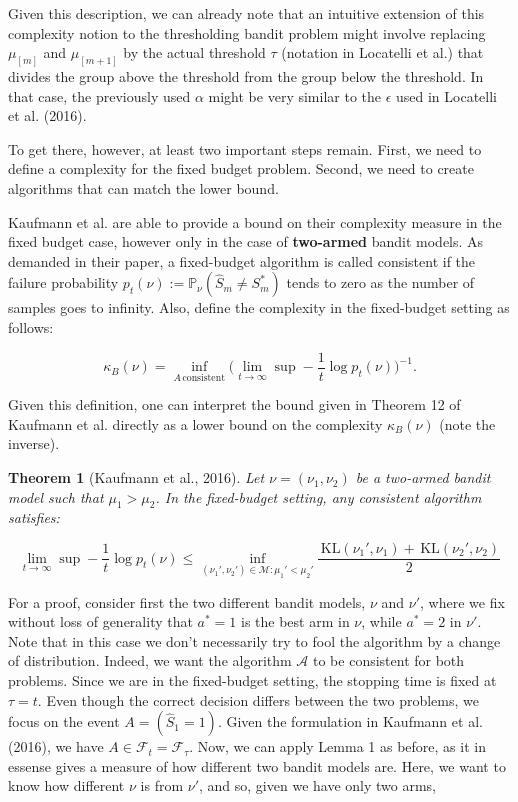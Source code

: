 \documentclass[12pt,]{article}
\newtheorem{theorem}{Theorem}
\newcommand{\KL}{\,\text{KL}}
\begin{document}
Given this description, we can already note that an intuitive extension
of this complexity notion to the thresholding bandit problem might
involve replacing \(\mu_{[m]}\) and \(\mu_{[m+1]}\) by the actual
threshold \(\tau\) (notation in Locatelli et al.) that divides the group
above the threshold from the group below the threshold. In that case,
the previously used \(\alpha\) might be very similar to the \(\epsilon\)
used in Locatelli et al. (2016).

To get there, however, at least two important steps remain. First, we
need to define a complexity for the fixed budget problem. Second, we
need to create algorithms that can match the lower bound.

Kaufmann et al. are able to provide a bound on their complexity measure
in the fixed budget case, however only in the case of \textbf{two-armed}
bandit models. As demanded in their paper, a fixed-budget algorithm is
called consistent if the failure probability
\(p_t(\nu) := \mathbb{P}_{\nu}(\hat{S}_m \neq S^*_m)\) tends to zero as
the number of samples goes to infinity. Also, define the complexity in
the fixed-budget setting as follows:

\begin{equation}
\kappa_B(\nu) = \inf_{A \, \text{consistent}} \big(\lim_{t \to \infty} \sup - \frac{1}{t} \log p_t(\nu)\big)^{-1}.
\end{equation}

Given this definition, one can interpret the bound given in Theorem 12
of Kaufmann et al. directly as a lower bound on the complexity
\(\kappa_B(\nu)\) (note the inverse).

\begin{theorem}[Kaufmann et al., 2016] \label{theorem:KaufmannEtAlTheorem12}
Let $\nu = (\nu_1, \nu_2)$ be a two-armed bandit model such that $\mu_1 > \mu_2$. In the fixed-budget setting, any consistent algorithm satisfies:

\begin{equation*}
\lim_{t \to \infty} \sup - \frac{1}{t} \log p_t(\nu) \leq \inf_{(\nu_1', \nu_2') \in \mathcal{M}: \mu_1' < \mu_2'} \frac{\KL(\nu_1', \nu_1) + \KL(\nu_2', \nu_2)}{2}
\end{equation*}
\end{theorem}

For a proof, consider first the two different bandit models, \(\nu\) and
\(\nu'\), where we fix without loss of generality that \(a^* = 1\) is
the best arm in \(\nu\), while \(a^* = 2\) in \(\nu'\). Note that in
this case we don't necessarily try to fool the algorithm by a change of
distribution. Indeed, we want the algorithm \(\mathcal{A}\) to be
consistent for both problems. Since we are in the fixed-budget setting,
the stopping time is fixed at \(\tau = t\). Even though the correct
decision differs between the two problems, we focus on the event
\(A = (\hat{S}_1 = 1)\). Given the formulation in Kaufmann et al.
(2016), we have \(A \in \mathcal{F}_t = \mathcal{F}_{\tau}\). Now, we
can apply Lemma 1 as before, as it in essense gives a measure of how
different two bandit models are. Here, we want to know how different
\(\nu\) is from \(\nu'\), and so, given we have only two arms,
\end{document}
